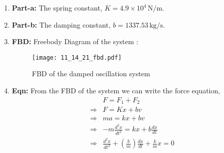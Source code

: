 \documentclass[journal,12pt,twocolumn]{IEEEtran}
\theoremstyle{remark}
\begin{document}
\begin{enumerate}
    \item \textbf{Part-a:}
    The spring constant, \(K = 4.9 \times 10^4\, \text{N/m}\).
    \item \textbf{Part-b:}
    The damping constant, \(b = 1337.53\, \text{kg/s}\).
\item \textbf{FBD:}
Freebody Diagram of the system :
\begin{figure}
        \centering
        \texttt{[image: 11\_14\_21\_fbd.pdf]}
        \caption{FBD of the damped oscillation system}
        \label{fig:enter-label}
    \end{figure}
\item \textbf{Eqn:}
From the FBD of the system we can write the force equation,
\begin{align}
    &F=F_{1}+F_{2}\\
    \Rightarrow&F=Kx+bv\\
    \Rightarrow&ma=kx+bv\\
    \Rightarrow&-m\frac{d^2x}{dt^2}=kx+b\frac{dx}{dt}\\
    \Rightarrow&\frac{d^2x}{dt^2}+\left(\frac{b}{m}\right)\frac{dx}{dt}+\frac{k}{m}x=0
\end{align}
\end{enumerate}   
\end{document}
